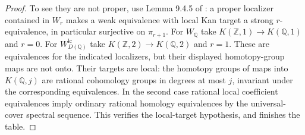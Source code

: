 \begin{proof}
To see they are not proper, use Lemma 9.4.5 of \citet{RESCisinski2006}: a proper localizer contained in $W_r$ makes a weak equivalence with local Kan target a strong $r$-equivalence, in particular surjective on $\pi_{r+1}$. For $W_{\mathbb Q}$ take $K(\mathbb Z,1)\to K(\mathbb Q,1)$ and $r=0$. For $W_{D(\mathbb Q)}^{\mathrm{lc}}$ take $K(\mathbb Z,2)\to K(\mathbb Q,2)$ and $r=1$. These are equivalences for the indicated localizers, but their displayed homotopy-group maps are not onto. Their targets are local: the homotopy groups of maps into $K(\mathbb Q,j)$ are rational cohomology groups in degrees at most $j$, invariant under the corresponding equivalences. In the second case rational local coefficient equivalences imply ordinary rational homology equivalences by the universal-cover spectral sequence. This verifies the local-target hypothesis, and finishes the table.
\end{proof}

